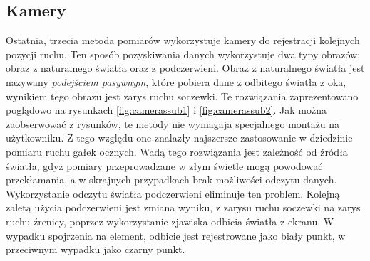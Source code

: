 \subsection{Kamery}
\label{ssec:cameras}
Ostatnia, trzecia metoda pomiarów wykorzystuje kamery do rejestracji kolejnych pozycji ruchu. Ten sposób pozyskiwania danych wykorzystuje dwa typy obrazów: obraz z naturalnego światła oraz z podczerwieni. Obraz z naturalnego światła jest nazywany \emph{podejściem pasywnym}, które pobiera dane z odbitego światła z oka, wynikiem tego obrazu jest zarys ruchu soczewki. Te rozwiązania zaprezentowano poglądowo na rysunkach \ref{fig:camerassub1} i \ref{fig:camerassub2}. Jak można zaobserwować z rysunków, te metody nie wymagaja specjalnego montażu na użytkowniku. Z tego względu one znalazły najszersze zastosowanie w dziedzinie pomiaru ruchu gałek ocznych. Wadą tego rozwiązania jest zależność od źródła światła, gdyż pomiary przeprowadzane w złym świetle mogą powodować przekłamania, a w skrajnych przypadkach brak możliwości odczytu danych. Wykorzystanie odczytu światła podczerwieni eliminuje ten problem. Kolejną zaletą użycia podczerwieni jest zmiana wyniku, z zarysu ruchu soczewki na zarys ruchu źrenicy, poprzez wykorzystanie zjawiska odbicia światła z ekranu. W wypadku spojrzenia na element, odbicie jest rejestrowane jako biały punkt, w przeciwnym wypadku jako czarny punkt.
